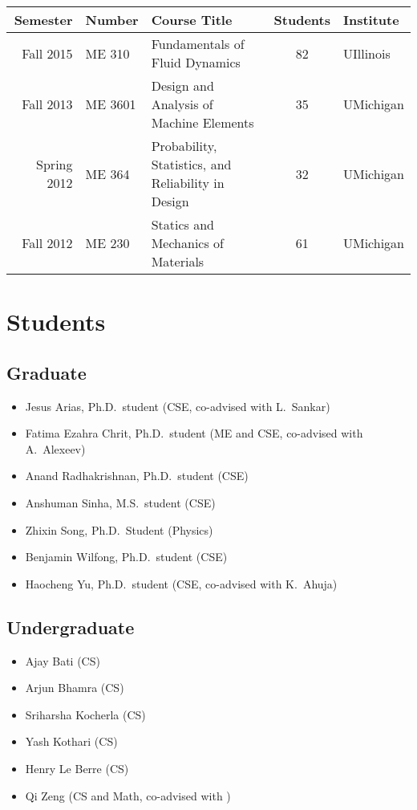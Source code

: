 \begin{center}
    \begin{tabular}{ r l l c l }
        \hline\hline
        \bf Semester  &\bf Number & \bf Course Title & \bf Students & \bf Institute \\
        \hline
        Fall   2015 & ME 310  & Fundamentals of Fluid Dynamics & 82 & UIllinois \\
        Fall   2013 & ME 3601 & Design and Analysis of Machine Elements & 35 & UMichigan\\
        Spring 2012 & ME 364  & Probability, Statistics, and Reliability in Design & 32 & UMichigan \\
        Fall   2012 & ME 230  & Statics and Mechanics of Materials & 61 & UMichigan \\
        \hline\hline
    \end{tabular}
\end{center}


\section{Students}

\subsection{Graduate}

\begin{itemize}
    \item Jesus Arias, Ph.D.\ student (CSE, co-advised with L.\ Sankar)
    \item Fatima Ezahra Chrit, Ph.D.\ student (ME and CSE, co-advised with A.\ Alexeev)
    \item Anand Radhakrishnan, Ph.D.\ student (CSE)
    \item Anshuman Sinha, M.S.\ student (CSE)
    \item Zhixin Song, Ph.D.\ Student (Physics)
    \item Benjamin Wilfong, Ph.D.\ student (CSE)
    \item Haocheng Yu, Ph.D.\ student (CSE, co-advised with K.\ Ahuja)
\end{itemize}

\subsection{Undergraduate}

\begin{itemize}
    \item Ajay Bati (CS)
    \item Arjun Bhamra (CS)
    \item Sriharsha Kocherla (CS)
    \item Yash Kothari (CS)
    \item Henry Le Berre (CS)
    \item Qi Zeng (CS and Math, co-advised with \Florian)
\end{itemize}

